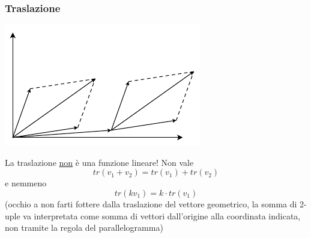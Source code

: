 \documentclass[12pt,a4paper,oneside]{article}
\begin{document}
\subsubsection*{Traslazione}
\begin{center}
	\includegraphics{Images/Traslazione.pdf}
\end{center}
La traslazione \underline{non} è una funzione lineare! Non vale
\[
	tr\left( v_1+v_2 \right) = tr\left( v_1 \right)  + tr\left( v_2 \right)
\]
e nemmeno
\[
	tr\left( kv_1 \right) = k\cdot tr\left( v_1 \right)
\]
(occhio a non farti fottere dalla traslazione del vettore geometrico, la somma di 2-uple va interpretata come somma di vettori dall'origine alla coordinata indicata, non tramite la regola del parallelogramma)
\end{document}
